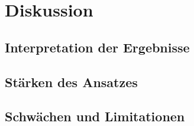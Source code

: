 \chapter{Diskussion} %
\label{chap:diskussion}

\section{Interpretation der Ergebnisse}

\section{Stärken des Ansatzes}

\section{Schwächen und Limitationen}